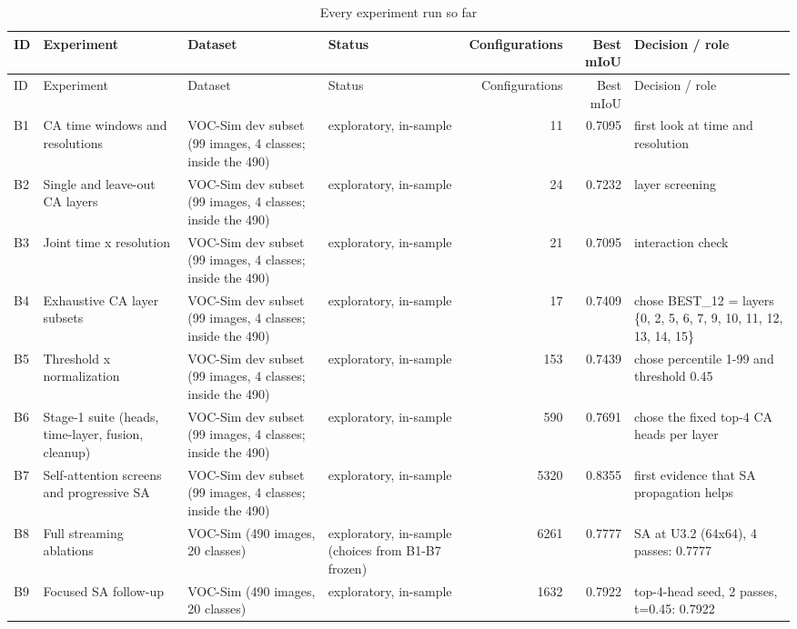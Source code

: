 {\scriptsize\setlength{\tabcolsep}{3pt}
\begin{longtable}{>{\raggedright\arraybackslash}p{1.40cm}>{\raggedright\arraybackslash}p{1.98cm}>{\raggedright\arraybackslash}p{2.53cm}>{\raggedright\arraybackslash}p{2.32cm}rr>{\raggedright\arraybackslash}p{2.83cm}}
\caption{Every experiment run so far}\label{tab:ledger}\\
\toprule
ID & Experiment & Dataset & Status & Configurations & Best mIoU & Decision /\allowbreak{} role \\
\midrule
\endfirsthead
\toprule
ID & Experiment & Dataset & Status & Configurations & Best mIoU & Decision /\allowbreak{} role \\
\midrule
\endhead
B1 & CA time windows and resolutions & VOC-Sim dev subset (99 images, 4 classes; inside the 490) & exploratory, in-sample & 11 & 0.7095 & first look at time and resolution \\
B2 & Single and leave-out CA layers & VOC-Sim dev subset (99 images, 4 classes; inside the 490) & exploratory, in-sample & 24 & 0.7232 & layer screening \\
B3 & Joint time x resolution & VOC-Sim dev subset (99 images, 4 classes; inside the 490) & exploratory, in-sample & 21 & 0.7095 & interaction check \\
B4 & Exhaustive CA layer subsets & VOC-Sim dev subset (99 images, 4 classes; inside the 490) & exploratory, in-sample & 17 & 0.7409 & chose BEST\_\allowbreak{}12 = layers \{0, 2, 5, 6, 7, 9, 10, 11, 12, 13, 14, 15\} \\
B5 & Threshold x normalization & VOC-Sim dev subset (99 images, 4 classes; inside the 490) & exploratory, in-sample & 153 & 0.7439 & chose percentile 1-99 and threshold 0.45 \\
B6 & Stage-1 suite (heads, time-layer, fusion, cleanup) & VOC-Sim dev subset (99 images, 4 classes; inside the 490) & exploratory, in-sample & 590 & 0.7691 & chose the fixed top-4 CA heads per layer \\
B7 & Self-attention screens and progressive SA & VOC-Sim dev subset (99 images, 4 classes; inside the 490) & exploratory, in-sample & 5320 & 0.8355 & first evidence that SA propagation helps \\
B8 & Full streaming ablations & VOC-Sim (490 images, 20 classes) & exploratory, in-sample (choices from B1-B7 frozen) & 6261 & 0.7777 & SA at U3.2 (64x64), 4 passes: 0.7777 \\
B9 & Focused SA follow-up & VOC-Sim (490 images, 20 classes) & exploratory, in-sample & 1632 & 0.7922 & top-4-head seed, 2 passes, t=0.45: 0.7922 \\

\end{longtable}}
